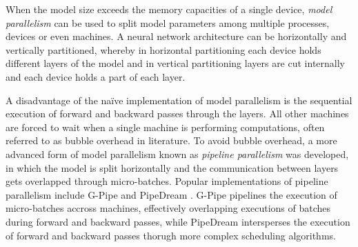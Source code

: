 When the model size exceeds the memory capacities of a single device, \textit{model parallelism} 
\cite*{10.48550/ARXIV.1811.02084, 10.48550/ARXIV.1909.08053} can be used to split model 
parameters among multiple processes, devices or even machines. A neural network architecture can be horizontally and vertically partitioned, 
whereby in horizontal partitioning each device holds different layers of the model and in vertical partitioning layers 
are cut internally and each device holds a part of each layer.

A disadvantage of the na\"ive implementation of model parallelism is the sequential execution of forward and backward passes 
through the layers. All other machines are forced to wait when a single machine is performing computations, often referred to 
as bubble overhead in literature. To avoid bubble overhead, a more advanced form of model parallelism known as \textit{pipeline parallelism}
was developed, in which the model is split horizontally and the communication between layers gets overlapped through micro-batches. 
Popular implementations of pipeline parallelism include G-Pipe \cite*{10.48550/ARXIV.1811.06965} and 
PipeDream \cite*{10.48550/ARXIV.1806.03377}. G-Pipe pipelines the execution of micro-batches accross machines, 
effectively overlapping executions of batches during forward and backward passes, while PipeDream intersperses the execution of 
forward and backward passes thorugh more complex scheduling algorithms. 

